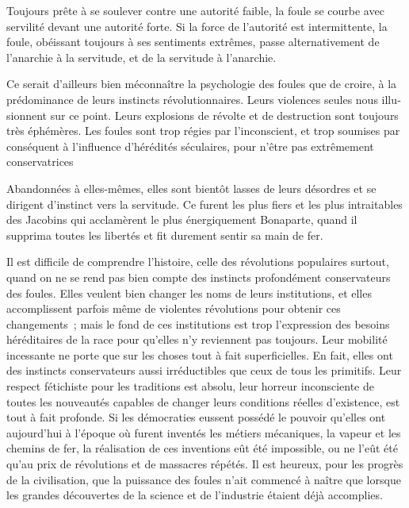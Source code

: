 \documentclass[french,twoside]{book} %
\begin{document}
Toujours prête à se soulever contre une autorité faible, la foule se courbe avec servilité devant une autorité forte. Si la force de l’autorité est intermittente, la foule, obéissant toujours à ses sentiments extrêmes, passe alternativement de l’anarchie à la servitude, et de la servitude à l’anarchie.\par
Ce serait d’ailleurs bien méconnaître la psychologie des foules que de croire, à la prédominance de leurs instincts révolutionnaires. Leurs violences seules nous illu­sionnent sur ce point. Leurs explosions de révolte et de destruction sont toujours très éphémères. Les foules sont trop régies par l’inconscient, et trop soumises par consé­quent à l’influence d’hérédités séculaires, pour n’être pas extrêmement conservatrices\par
Abandonnées à elles-mêmes, elles sont bientôt lasses de leurs désordres et se dirigent d’instinct vers la servitude. Ce furent les plus fiers et les plus intraitables des Jacobins qui acclamèrent le plus énergiquement Bonaparte, quand il supprima toutes les libertés et fit durement sentir sa main de fer.\par
Il est difficile de comprendre l’histoire, celle des révolutions populaires surtout, quand on ne se rend pas bien compte des instincts profondément conservateurs des foules. Elles veulent bien changer les noms de leurs institutions, et elles accomplis­sent parfois même de violentes révolutions pour obtenir ces changements ; mais le fond de ces institutions est trop l’expression des besoins héréditaires de la race pour qu’elles n’y reviennent pas toujours. Leur mobilité incessante ne porte que sur les choses tout à fait superficielles. En fait, elles ont des instincts conservateurs aussi irréductibles que ceux de tous les primitifs. Leur respect fétichiste pour les traditions est absolu, leur horreur inconsciente de toutes les nouveautés capables de changer leurs conditions réelles d’existence, est tout à fait profonde. Si les démocraties eussent possédé le pouvoir qu’elles ont aujourd’hui à l’époque où furent inventés les métiers mécaniques, la vapeur et les chemins de fer, la réalisation de ces inventions eût été impossible, ou ne l’eût été qu’au prix de révolutions et de massacres répétés. Il est heureux, pour les progrès de la civilisation, que la puissance des foules n’ait com­mencé à naître que lorsque les grandes découvertes de la science et de l’industrie étaient déjà accomplies.
\end{document}
